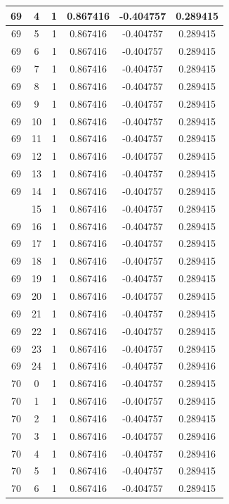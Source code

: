 \documentclass[12pt,a4paper]{article}
\numberwithin{equation}{section}
\numberwithin{figure}{section}
\numberwithin{table}{section}
\begin{document}
\begin{longtable}{|c|c|c|c|c|c|}
69 & 4 & 1 & 0.867416 & -0.404757 & 0.289415 \\ \hline
69 & 5 & 1 & 0.867416 & -0.404757 & 0.289415 \\ \hline
69 & 6 & 1 & 0.867416 & -0.404757 & 0.289415 \\ \hline
69 & 7 & 1 & 0.867416 & -0.404757 & 0.289415 \\ \hline
69 & 8 & 1 & 0.867416 & -0.404757 & 0.289415 \\ \hline
69 & 9 & 1 & 0.867416 & -0.404757 & 0.289415 \\ \hline
69 & 10 & 1 & 0.867416 & -0.404757 & 0.289415 \\ \hline
69 & 11 & 1 & 0.867416 & -0.404757 & 0.289415 \\ \hline
69 & 12 & 1 & 0.867416 & -0.404757 & 0.289415 \\ \hline
69 & 13 & 1 & 0.867416 & -0.404757 & 0.289415 \\ \hline
69 & 14 & 1 & 0.867416 & -0.404757 & 0.289415 \\ \hline
\pagebreak
69 & 15 & 1 & 0.867416 & -0.404757 & 0.289415 \\ \hline
69 & 16 & 1 & 0.867416 & -0.404757 & 0.289415 \\ \hline
69 & 17 & 1 & 0.867416 & -0.404757 & 0.289415 \\ \hline
69 & 18 & 1 & 0.867416 & -0.404757 & 0.289415 \\ \hline
69 & 19 & 1 & 0.867416 & -0.404757 & 0.289415 \\ \hline
69 & 20 & 1 & 0.867416 & -0.404757 & 0.289415 \\ \hline
69 & 21 & 1 & 0.867416 & -0.404757 & 0.289415 \\ \hline
69 & 22 & 1 & 0.867416 & -0.404757 & 0.289415 \\ \hline
69 & 23 & 1 & 0.867416 & -0.404757 & 0.289415 \\ \hline
69 & 24 & 1 & 0.867416 & -0.404757 & 0.289416 \\ \hline
70 & 0 & 1 & 0.867416 & -0.404757 & 0.289415 \\ \hline
70 & 1 & 1 & 0.867416 & -0.404757 & 0.289415 \\ \hline
70 & 2 & 1 & 0.867416 & -0.404757 & 0.289415 \\ \hline
70 & 3 & 1 & 0.867416 & -0.404757 & 0.289416 \\ \hline
70 & 4 & 1 & 0.867416 & -0.404757 & 0.289416 \\ \hline
70 & 5 & 1 & 0.867416 & -0.404757 & 0.289415 \\ \hline
70 & 6 & 1 & 0.867416 & -0.404757 & 0.289415 \\ \hline

\end{longtable}
\end{document}
